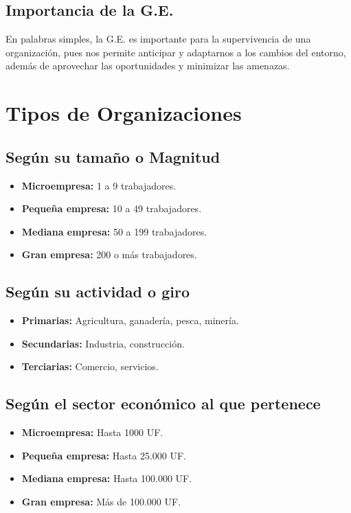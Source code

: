 \documentclass{templateNote}
\begin{document}
\newpage
\subsection{Importancia de la G.E.}
En palabras simples, la G.E. es importante para la supervivencia de una organizaci\'on, pues nos permite anticipar y adaptarnos a los cambios del entorno, adem\'as de aprovechar las oportunidades y minimizar las amenazas.

\section{Tipos de Organizaciones}
\subsection{Seg\'un su tama\~no o Magnitud}
\begin{itemize}
    \item \textbf{Microempresa:} 1 a 9 trabajadores.
    
    \item \textbf{Peque\~na empresa:} 10 a 49 trabajadores.
    
    \item \textbf{Mediana empresa:} 50 a 199 trabajadores.
    
    \item \textbf{Gran empresa:} 200 o m\'as trabajadores.
\end{itemize}

\subsection{Seg\'un su actividad o giro}
\begin{itemize}
    \item \textbf{Primarias:} Agricultura, ganader\'ia, pesca, miner\'ia.
    
    \item \textbf{Secundarias:} Industria, construcci\'on.
    
    \item \textbf{Terciarias:} Comercio, servicios.
\end{itemize}

\subsection{Seg\'un el sector econ\'omico al que pertenece}
\begin{itemize}
    \item \textbf{Microempresa:} Hasta 1000 UF.
    
    \item \textbf{Peque\~na empresa:} Hasta 25.000 UF.
    
    \item \textbf{Mediana empresa:} Hasta 100.000 UF.
    
    \item \textbf{Gran empresa:} M\'as de 100.000 UF.
\end{itemize}
\end{document}
